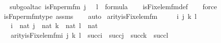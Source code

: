 \begin{isabellebody}
%
\isadelimproof
\ \ %
\endisadelimproof
%
\isatagproof
{}\isamarkupfalse%
{\isacharparenleft}{\kern0pt}subgoal{\isacharunderscore}{\kern0pt}tac\ {\isachardoublequoteopen}is{\isacharunderscore}{\kern0pt}Fn{\isacharunderscore}{\kern0pt}perm{\isacharprime}{\kern0pt}{\isacharunderscore}{\kern0pt}fm{\isacharparenleft}{\kern0pt}{}{\isacharcomma}{\kern0pt}\ j\ {\isacharhash}{\kern0pt}{\isacharplus}{\kern0pt}\ {}{\isacharcomma}{\kern0pt}\ l{\isacharhash}{\kern0pt}{\isacharplus}{\kern0pt}{}{\isacharparenright}{\kern0pt}\ {\isasymin}\ formula{\isachardoublequoteclose}{\isacharparenright}{\kern0pt}\isanewline
\ \ \isamarkupfalse%
\ is{\isacharunderscore}{\kern0pt}Fix{\isacharunderscore}{\kern0pt}elem{\isacharunderscore}{\kern0pt}fm{\isacharunderscore}{\kern0pt}def\isanewline
\ \ \isamarkupfalse%
\ force\isanewline
\ \ \isamarkupfalse%
\ is{\isacharunderscore}{\kern0pt}Fn{\isacharunderscore}{\kern0pt}perm{\isacharprime}{\kern0pt}{\isacharunderscore}{\kern0pt}fm{\isacharunderscore}{\kern0pt}type\ assms\isanewline
\ \ \isamarkupfalse%
\ auto%
\endisatagproof
{\isafoldproof}%
%
\isadelimproof
\isanewline
%
\endisadelimproof
\isanewline
{}\isamarkupfalse%
\ arity{\isacharunderscore}{\kern0pt}is{\isacharunderscore}{\kern0pt}Fix{\isacharunderscore}{\kern0pt}elem{\isacharunderscore}{\kern0pt}fm\ {\isacharcolon}{\kern0pt}\ \isanewline
\ \ \ i\ j\ k\ l\ \isanewline
\ \ \ {\isachardoublequoteopen}i\ {\isasymin}\ nat{\isachardoublequoteclose}\ {\isachardoublequoteopen}j\ {\isasymin}\ nat{\isachardoublequoteclose}\ {\isachardoublequoteopen}k\ {\isasymin}\ nat{\isachardoublequoteclose}\ {\isachardoublequoteopen}l\ {\isasymin}\ nat{\isachardoublequoteclose}\ \isanewline
\ \ \ {\isachardoublequoteopen}arity{\isacharparenleft}{\kern0pt}is{\isacharunderscore}{\kern0pt}Fix{\isacharunderscore}{\kern0pt}elem{\isacharunderscore}{\kern0pt}fm{\isacharparenleft}{\kern0pt}i{\isacharcomma}{\kern0pt}\ j{\isacharcomma}{\kern0pt}\ k{\isacharcomma}{\kern0pt}\ l{\isacharparenright}{\kern0pt}{\isacharparenright}{\kern0pt}\ {\isasymle}\ succ{\isacharparenleft}{\kern0pt}i{\isacharparenright}{\kern0pt}\ {\isasymunion}\ succ{\isacharparenleft}{\kern0pt}j{\isacharparenright}{\kern0pt}\ {\isasymunion}\ succ{\isacharparenleft}{\kern0pt}k{\isacharparenright}{\kern0pt}\ {\isasymunion}\ succ{\isacharparenleft}{\kern0pt}l{\isacharparenright}{\kern0pt}{\isachardoublequoteclose}\isanewline
%
\isadelimproof
\ \ %
\endisadelimproof

\end{isabellebody}
